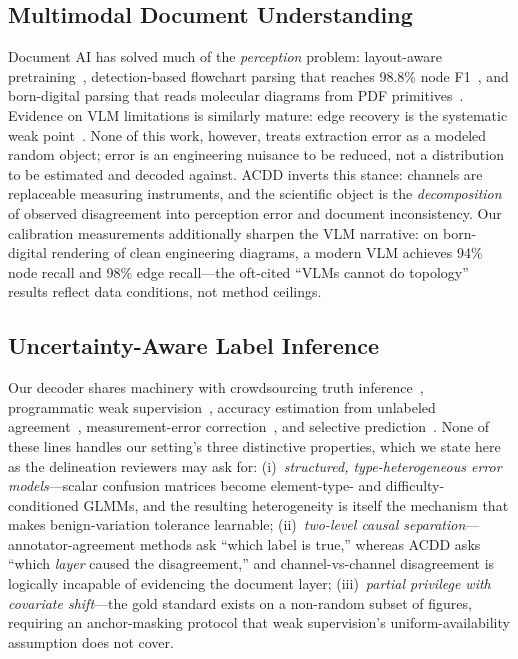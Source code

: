 \documentclass[10pt,twocolumn]{article}
\begin{document}
\subsection{Multimodal Document Understanding}
Document AI has solved much of the \emph{perception} problem:
layout-aware pretraining~\cite{layoutlm2020}, detection-based
flowchart parsing that reaches 98.8\% node
F1~\cite{flowextract2026}, and born-digital parsing that reads
molecular diagrams from PDF
primitives~\cite{li2024chemscraper}.  Evidence on VLM limitations is
similarly mature: edge recovery is the systematic weak
point~\cite{priorbias2026}.  None of this work, however, treats
extraction error as a modeled random object; error is an engineering
nuisance to be reduced, not a distribution to be estimated and
decoded against.  ACDD inverts this stance: channels are replaceable
measuring instruments, and the scientific object is the
\emph{decomposition} of observed disagreement into perception error
and document inconsistency.  Our calibration measurements
additionally sharpen the VLM narrative: on born-digital rendering of
clean engineering diagrams, a modern VLM achieves 94\% node recall
and 98\% edge recall---the oft-cited ``VLMs cannot do topology''
results reflect data conditions, not method ceilings.

\subsection{Uncertainty-Aware Label Inference}
Our decoder shares machinery with crowdsourcing truth
inference~\cite{dawid1979maximum}, programmatic weak
supervision~\cite{ratner2016data}, accuracy estimation from unlabeled
agreement~\cite{platanios2017estimating}, measurement-error
correction~\cite{carroll2006measurement}, and selective
prediction~\cite{geifman2017selective}.  None of these lines handles
our setting's three distinctive properties, which we state here as
the delineation reviewers may ask for:
(i)~\emph{structured, type-heterogeneous error models}---scalar
confusion matrices become element-type- and
difficulty-conditioned GLMMs, and the resulting heterogeneity is
itself the mechanism that makes benign-variation tolerance learnable;
(ii)~\emph{two-level causal separation}---annotator-agreement methods
ask ``which label is true,'' whereas ACDD asks ``which \emph{layer}
caused the disagreement,'' and channel-vs-channel disagreement is
logically incapable of evidencing the document layer;
(iii)~\emph{partial privilege with covariate shift}---the gold
standard exists on a non-random subset of figures, requiring an
anchor-masking protocol that weak supervision's uniform-availability
assumption does not cover.
\end{document}
